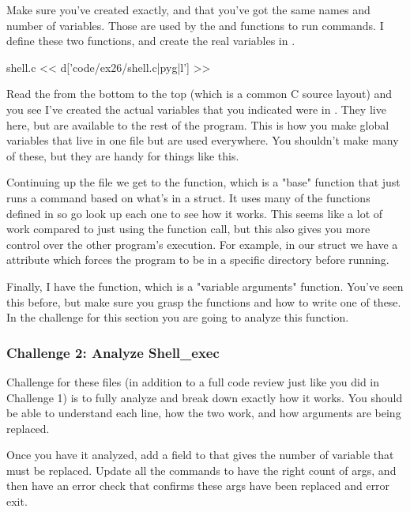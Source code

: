 Make sure you've created  exactly, and that you've got the
same names and number of  variables.  Those are used
by the  and  functions to run commands.
I define these two functions, and create the real variables in .

\begin{code}{shell.c}
<< d['code/ex26/shell.c|pyg|l'] >>
\end{code}

Read the  from the bottom to the top (which is a common C source
layout) and you see I've created the actual  variables that you
indicated were  in .  They live here, but are 
available to the rest of the program.  This is how you make global variables
that live in one  file but are used everywhere.  You shouldn't make
many of these, but they are handy for things like this.

Continuing up the file we get to the  function, which is
a "base" function that just runs a command based on what's in a 
struct.  It uses many of the functions defined in 
so go look up each one to see how it works.  This seems like a lot of work
compared to just using the  function call, but this also gives
you more control over the other program's execution.  For example, in our
 struct we have a  attribute which forces the program
to be in a specific directory before running.

Finally, I have the  function, which is a "variable arguments"
function.  You've seen this before, but make sure you grasp the 
functions and how to write one of these.  In the challenge for this section
you are going to analyze this function.

\subsubsection{Challenge 2: Analyze Shell\_exec}

Challenge for these files (in addition to a full code review just like you
did in Challenge 1) is to fully analyze  and break down
exactly how it works.  You should be able to understand each line, how
the two  work, and how arguments are being replaced.

Once you have it analyzed, add a field to  that gives
the number of variable  that must be replaced.  Update all the
commands to have the right count of args, and then have an error check that
confirms these args have been replaced and error exit.

